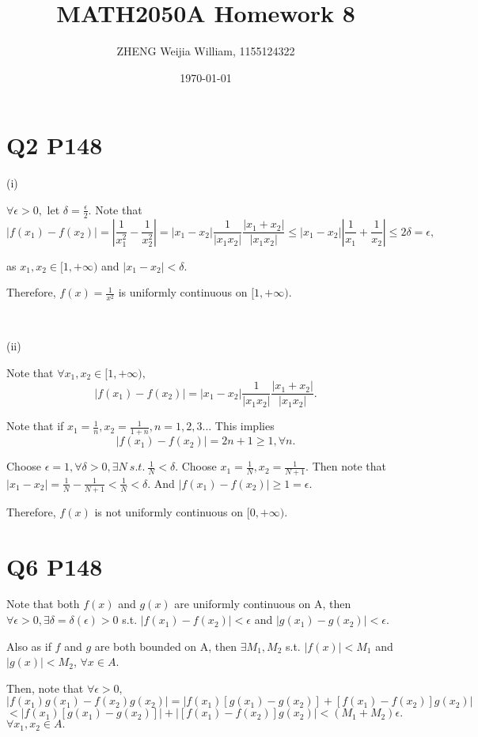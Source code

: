 \documentclass[12pt]{article}%
\begin{document}
\title{MATH2050A Homework 8}
\author{ZHENG Weijia William, 1155124322}
\date{\today}
\maketitle


\section{Q2 P148}

(i)

$\forall \epsilon>0,$ let $\delta = \frac{\epsilon}{2}$. Note that $$|f(x_1)-f(x_2)|=|\frac{1}{x_1^2}-\frac{1}{x_2^2}|=|x_1-x_2|\frac{1}{|x_1 x_2|}\frac{|x_1+x_2|}{|x_1 x_2|}\leq|x_1-x_2||\frac{1}{x_1}+\frac{1}{x_2}|\leq 2\delta = \epsilon,$$ 

as $x_1,x_2 \in [1,+\infty)$ and $|x_1-x_2|<\delta.$

Therefore, $f(x)=\frac{1}{x^2}$ is uniformly continuous on $[1,+\infty)$.

~\

(ii)

Note that $\forall x_1,x_2 \in [1,+\infty),$ $$|f(x_1)-f(x_2)|=|x_1-x_2|\frac{1}{|x_1 x_2|}\frac{|x_1+x_2|}{|x_1 x_2|}.$$

Note that if $x_1 = \frac{1}{n}, x_2=\frac{1}{1+n},n=1,2,3...$ This implies $$|f(x_1)-f(x_2)|=2n+1 \geq 1, \forall n.$$ 

Choose $\epsilon = 1, \forall \delta >0, \exists N~s.t.~\frac{1}{N}<\delta.$ 
Choose $x_1=\frac{1}{N}, x_2=\frac{1}{N+1}.$ Then note that $|x_1-x_2|=\frac{1}{N}-\frac{1}{N+1}<\frac{1}{N}<\delta.$ And $|f(x_1)-f(x_2)|\geq 1=\epsilon.$ 

Therefore, $f(x)$ is not uniformly continuous on $[0,+\infty).$


\section{Q6 P148}
Note that both $f(x)$ and $g(x)$ are uniformly continuous on A, then $\forall \epsilon>0, \exists \delta=\delta(\epsilon)>0$ s.t. $|f(x_1)-f(x_2)|<\epsilon$ and $|g(x_1)-g(x_2)|<\epsilon.$ 

Also as if $f$ and $g$ are both bounded on A, then $\exists M_1, M_2$ s.t. $|f(x)|<M_1$ and $|g(x)|<M_2$, $\forall x \in A.$

Then, note that $\forall \epsilon >0,$ $$|f(x_1)g(x_1)-f(x_2)g(x_2)|=|f(x_1)[g(x_1)-g(x_2)]+[f(x_1)-f(x_2)]g(x_2)|$$ $<|f(x_1)[g(x_1)-g(x_2)]|+|[f(x_1)-f(x_2)]g(x_2)|<(M_1+ M_2)\epsilon.$ $\forall x_1,x_2 \in A.$  
\end{document}
